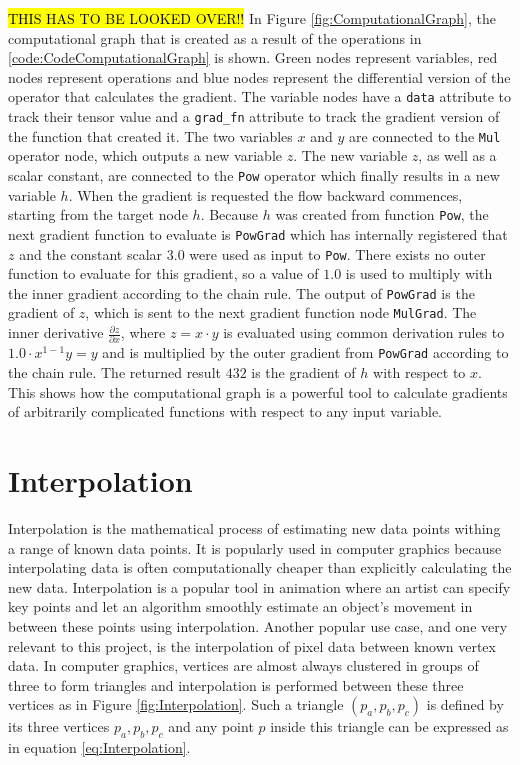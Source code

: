 \hl{THIS HAS TO BE LOOKED OVER!!}
In Figure \ref{fig:ComputationalGraph}, the computational graph that is created as a result of the operations in \ref{code:CodeComputationalGraph} is shown. Green nodes represent variables, red nodes represent operations and blue nodes represent the differential version of the operator that calculates the gradient. The variable nodes have a \texttt{data} attribute to track their tensor value and a \texttt{grad\_fn} attribute to track the gradient version of the function that created it. The two variables $x$ and $y$ are connected to the \texttt{Mul} operator node, which outputs a new variable $z$. The new variable $z$, as well as a scalar constant, are connected to the \texttt{Pow} operator which finally results in a new variable $h$. When the gradient is requested the flow backward commences, starting from the target node $h$. Because $h$ was created from function \texttt{Pow}, the next gradient function to evaluate is \texttt{PowGrad} which has internally registered that $z$ and the constant scalar $3.0$ were used as input to \texttt{Pow}. There exists no outer function to evaluate for this gradient, so a value of $1.0$ is used to multiply with the inner gradient according to the chain rule. The output of \texttt{PowGrad} is the gradient of $z$, which is sent to the next gradient function node \texttt{MulGrad}. The inner derivative $\frac{\partial z}{\partial x}$, where $z=x\cdot y$ is evaluated using common derivation rules to $1.0\cdot x^{1-1}y = y$ and is multiplied by the outer gradient from \texttt{PowGrad} according to the chain rule. The returned result $432$ is the gradient of $h$ with respect to $x$. This shows how the computational graph is a powerful tool to calculate gradients of arbitrarily complicated functions with respect to any input variable.

\section{Interpolation}\label{sec:Interpolation}

Interpolation is the mathematical process of estimating new data points withing a range of known data points. It is popularly used in computer graphics because interpolating data is often computationally cheaper than explicitly calculating the new data. Interpolation is a popular tool in animation where an artist can specify key points and let an algorithm smoothly estimate an object's movement in between these points using interpolation. Another popular use case, and one very relevant to this project, is the interpolation of pixel data between known vertex data. In computer graphics, vertices are almost always clustered in groups of three to form triangles and interpolation is performed between these three vertices as in Figure \ref{fig:Interpolation}. Such a triangle $(p_a,p_b,p_c)$ is defined by its three vertices $p_a,p_b,p_c$ and any point $p$ inside this triangle can be expressed as in equation \ref{eq:Interpolation}.

